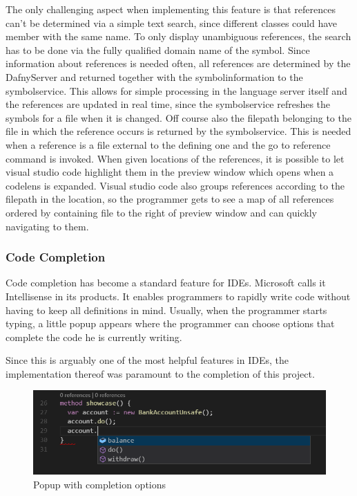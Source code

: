 The only challenging aspect when implementing this feature is that references can't be determined via a simple text search, since different classes could have member with the same name. To only display unambiguous references, the search has to be done via the fully qualified domain name of the symbol. Since information about references is needed often, all references are determined by the DafnyServer and returned together with the symbolinformation to the symbolservice. This allows for simple processing in the language server itself and the references are updated in real time, since the symbolservice refreshes the symbols for a file when it is changed. Off course also the filepath belonging to the file in which the reference occurs is returned by the symbolservice. This is needed when a reference is a file external to the defining one and the go to reference command is invoked.\newline
When given locations of the references, it is possible to let visual studio code highlight them in the preview window which opens when a codelens is expanded. Visual studio code also groups references according to the filepath in the location, so the programmer gets to see a map of all references ordered by containing file to the right of preview window and can quickly navigating to them.

 \subsubsection{Code Completion} \label{codecompletion}
 Code completion has become a standard feature for IDEs. Microsoft calls it Intellisense in its products. It enables programmers to rapidly write code without having to keep all definitions in mind. Usually, when the programmer starts typing, a little popup appears where the programmer can choose options that complete the code he is currently writing. \newline
 
 Since this is arguably one of the most helpful features in IDEs, the implementation thereof was paramount to the completion of this project. \newline
 
 \begin{figure}[H]
 	\centering
 	\includegraphics[width=1\textwidth]{img/codeCompletionOverview}
 	\caption{Popup with completion options}
 	\label{fig:codecompletionoverview}
 \end{figure}
 
